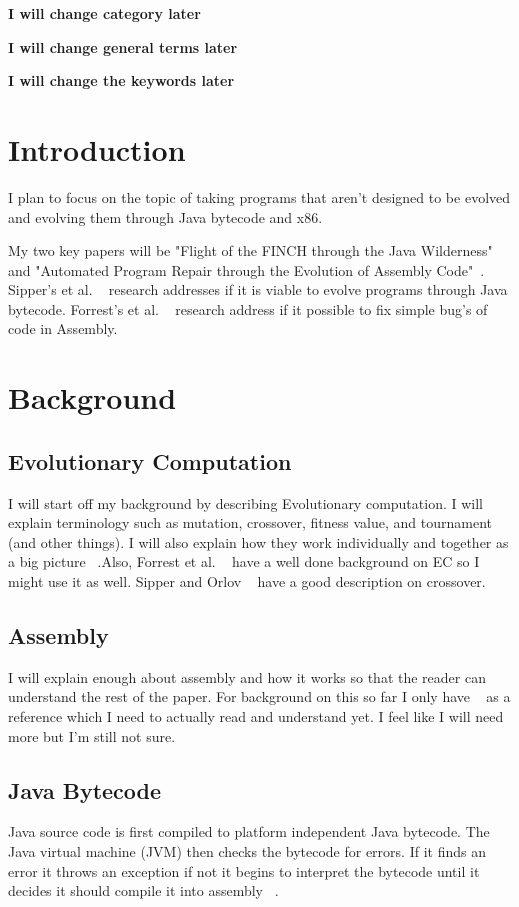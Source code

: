 \documentclass{sig-alternate}
\newcommand{\mycomment}[1]{{\bf #1}}
\begin{document}
\mycomment{I will change category later}

\terms{}
\mycomment{I will change general terms later}


\mycomment{I will change the keywords later}

\section{Introduction}
I plan to focus on the topic of taking programs that aren't designed to be evolved and evolving them through Java bytecode and x86.

My two key papers will be "Flight of the FINCH through the Java Wilderness"~\cite{FINCH:2010} and "Automated Program Repair through the Evolution of Assembly Code"~\cite{Assembly:2010}. Sipper's et al. ~\cite{FINCH:2010} research addresses if it is viable to evolve programs through Java bytecode. Forrest's et al. ~\cite{Assembly:2010} research address if it possible to fix simple bug's of code in Assembly. 


\section{Background}

\subsection{Evolutionary Computation}
I will start off my background by describing Evolutionary computation. I will explain terminology such as mutation, crossover, fitness value, and tournament (and other things). I will also explain how they work individually and together as a big picture ~\cite{Nic:2008}.Also, Forrest et al. ~\cite{Assembly:2010} have a well done background on EC so I might use it as well. Sipper and Orlov ~\cite{FINCH:2010} have a good description on crossover.
\subsection{Assembly}
I will explain enough about assembly and how it works so that the reader can understand the rest of the paper. For background on this so far I only have ~\cite{x86:2014} as a reference which I need to actually read and understand yet. I feel like I will need more but I'm still not sure.
\subsection{Java Bytecode}
Java source code is first compiled to platform independent Java bytecode. The Java virtual machine (JVM) then checks the bytecode for errors. If it finds an error it throws an exception if not it begins to interpret the bytecode until it decides it should compile it into assembly ~\cite{FINCH:2010}.
\end{document}
